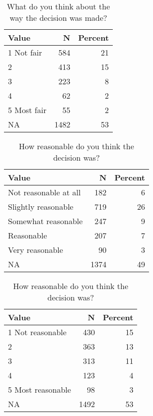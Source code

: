 \documentclass[
]{book}
\begin{document}
\begin{table}[H]

\caption{\label{tab:unnamed-chunk-4}What do you think about the way the decision was made?}
\centering
\begin{tabular}[t]{lrr}
\toprule
Value & N & Percent\\
\midrule
1 Not fair & 584 & 21\\
2 & 413 & 15\\
3 & 223 & 8\\
4 & 62 & 2\\
5 Most fair & 55 & 2\\
NA & 1482 & 53\\
\bottomrule
\end{tabular}
\end{table}

\begin{table}[H]

\caption{\label{tab:unnamed-chunk-4}How reasonable do you think the decision was?}
\centering
\begin{tabular}[t]{lrr}
\toprule
Value & N & Percent\\
\midrule
Not reasonable at all & 182 & 6\\
Slightly reasonable & 719 & 26\\
Somewhat reasonable & 247 & 9\\
Reasonable & 207 & 7\\
Very reasonable & 90 & 3\\
NA & 1374 & 49\\
\bottomrule
\end{tabular}
\end{table}

\begin{table}[H]

\caption{\label{tab:unnamed-chunk-4}How reasonable do you think the decision was?}
\centering
\begin{tabular}[t]{lrr}
\toprule
Value & N & Percent\\
\midrule
1 Not reasonable & 430 & 15\\
2 & 363 & 13\\
3 & 313 & 11\\
4 & 123 & 4\\
5 Most reasonable & 98 & 3\\
NA & 1492 & 53\\
\bottomrule
\end{tabular}
\end{table}
\end{document}
